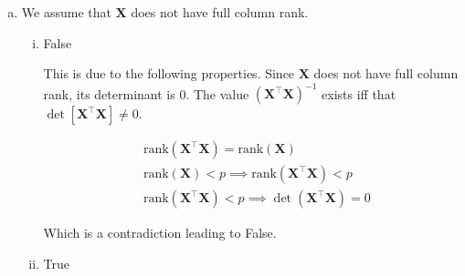 \documentclass[12pt,letterpaper, onecolumn]{exam}
\begin{document}
\begin{questions}
\begin{solution}
\begin{enumerate}[a.)]
\begin{enumerate}[i.)]
            \begin{align*}
                \textbf{M}^2 &= (\textbf{I} - \textbf{H})(\textbf{I} - \textbf{H}) \\
                & = \textbf{I}^2 - \textbf{HI} - \textbf{IH} + \textbf{H}^2 \\
                & = \textbf{I} - 2\textbf{H} + \textbf{H} \quad \text{since} \quad \textbf{H}^2=\textbf{H} \\
                &= \textbf{I} - \textbf{H} \\
                &= \textbf{M}
            \end{align*}
            \item True

            \begin{align*}
                \textbf{HM} & = \textbf{H}(\textbf{I} - \textbf{H}) \\
                &= \textbf{HI} - \textbf{H}^2 \\
                &= \textbf{H} - \textbf{H} \quad \text{since} \quad \textbf{H}^2=\textbf{H} \\
                & = 0
            \end{align*}
        \end{enumerate}
        \item We assume that $\textbf{X}$ does not have full column rank.
        \begin{enumerate}[i.)]
            \item False

            This is due to the following properties. Since $\textbf{X}$ does not have full column rank, its determinant is 0. The value $(\textbf{X}^\intercal\textbf{X})^{-1}$ exists iff that $\det[\textbf{X}^\intercal\textbf{X}]\neq0$.
            
            \begin{align*}
               & \text{rank}(\textbf{X}^\intercal\textbf{X}) =  \text{rank}(\textbf{X}) \\
               & \text{rank}(\textbf{X}) < p \implies \text{rank}(\textbf{X}^\intercal\textbf{X}) < p \\
               & \text{rank}(\textbf{X}^\intercal\textbf{X}) < p\implies  \det(\textbf{X}^\intercal\textbf{X})=0
            \end{align*}

            Which is a contradiction leading to False.

            \item True


\end{enumerate}
\end{enumerate}
\end{solution}
\end{questions}
\end{document}
